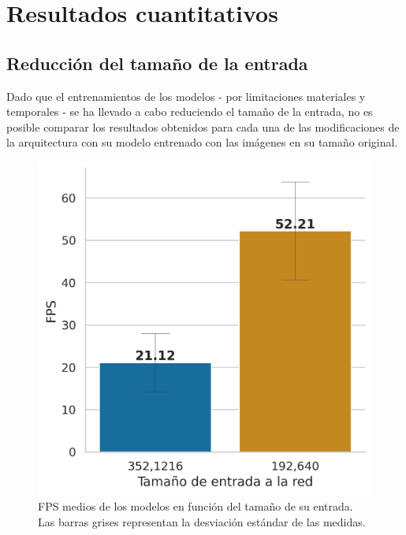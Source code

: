 \section{Resultados cuantitativos}

\subsection{Reducción del tamaño de la entrada}

Dado que el entrenamientos de los modelos - por limitaciones materiales y temporales - se ha llevado a cabo reduciendo el tamaño de la entrada, no es posible comparar los resultados obtenidos para cada una de las modificaciones de la arquitectura con su modelo entrenado con las imágenes en su tamaño original.

\begin{figure}
\vspace{-15pt}
\includegraphics[width=0.95\linewidth]{imagenes/Resultados/velocidad_inferencia_entrada.png} 
\caption{FPS medios de los modelos en función del tamaño de su entrada. Las barras grises representan la desviación estándar de las medidas.}
\label{fig:resultados-inf-tam-entrada}
\end{figure}

